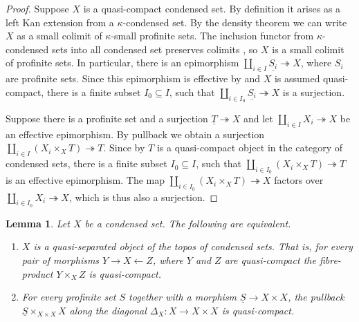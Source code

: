 \documentclass{amsart}
\newtheorem{lem}[prop]{Lemma}
\theoremstyle{definition}
\theoremstyle{remark}
\begin{document}
\begin{proof}
    Suppose $X$ is a quasi-compact condensed set. By definition it arises as a left Kan extension from a $\kappa$-condensed set.
    By the density theorem \cite[Theorem III.7.1]{MacLaneCat} we can write $X$ as a small colimit of $\kappa$-small profinite sets.
    The inclusion functor from $\kappa$-condensed sets into all condensed set preserves colimits \cite[Proposition 2.9]{ScholzeCond}, so $X$ is a small colimit of profinite sets. In particular, there is an epimorphism $\coprod_{i \in I} \underline{S_i} \twoheadrightarrow X$, where $S_i$ are profinite sets. Since this epimorphism is effective by  and $X$ is assumed quasi-compact, there is a finite subset $I_0 \subseteq I$, such that $\coprod_{i \in I_0} \underline{S_i} \twoheadrightarrow X$ is a surjection.

    Suppose there is a profinite set and a surjection $\underline T \twoheadrightarrow X$ and let $\coprod_{i \in I} X_i \twoheadrightarrow X$ be an effective epimorphism. By pullback we obtain a surjection $\coprod_{i \in I} (X_i \times_X T) \twoheadrightarrow T$. Since by \cite[Proposition 1.2 (3)]{ScholzeAnalytic} $T$ is a quasi-compact object in the category of condensed sets, there is a finite subset $I_0 \subseteq I$, such that $\coprod_{i \in I_0} (X_i \times_X T) \twoheadrightarrow T$ is an effective epimorphism. The map $\coprod_{i \in I_0} (X_i \times_X T) \twoheadrightarrow X$ factors over $\coprod_{i \in I_0} X_i \twoheadrightarrow X$, which is thus also a surjection.
\end{proof}

\begin{lem}\label{char_qs}
    Let $X$ be a condensed set. The following are equivalent.
    \begin{enumerate}
        \item $X$ is a quasi-separated object of the topos of condensed sets. That is, for every pair of morphisms $Y \to X \leftarrow Z$, where $Y$ and $Z$ are quasi-compact the fibre-product $Y \times_X Z$ is quasi-compact.
        \item For every profinite set $S$ together with a morphism $\underline S \to X \times X$, the pullback $\underline S \times_{X \times X} X$ along the diagonal $\Delta_X : X \to X \times X$ is quasi-compact.
    \end{enumerate}
\end{lem}
\end{document}
